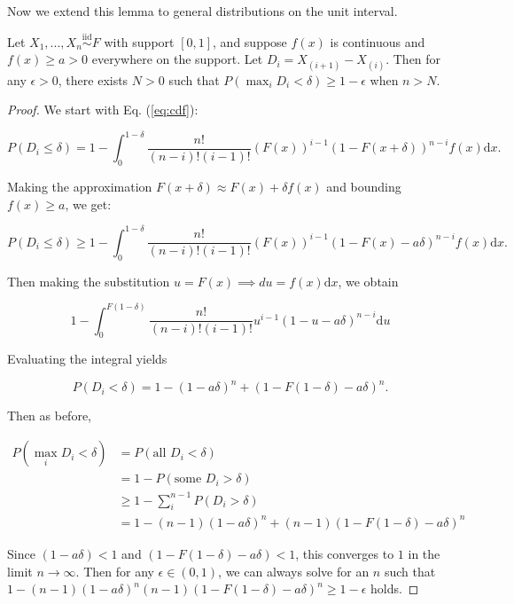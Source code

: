 \documentclass[12pt]{article}
\begin{document}
Now we extend this lemma to general distributions on the unit interval.

\begin{lemma}
\label{lem:lim-d}
Let $X_1, ..., X_n \stackrel{\mathrm{iid}}{\sim}F$ with support $[0, 1]$, and suppose $f(x)$ is continuous and $f(x) \geq a > 0$ everywhere on the support. 
Let $D_i = X_{(i+1)} - X_{(i)}$. 
Then for any $\epsilon > 0$, there exists $N > 0$ such that $P(\max_i D_i < \delta) \geq 1 - \epsilon$ when $n > N$.
\end{lemma}

\begin{proof}
We start with Eq. (\ref{eq:cdf}):

$$P(D_i \leq \delta) = 1 - \int_0^{1-\delta} \frac{n!}{(n-i)! (i-1)!} (F(x))^{i-1} (1 - F(x + \delta))^{n-i} f(x) \mathrm{d}x.$$

Making the approximation $F(x+\delta) \approx F(x) + \delta f(x)$ 
and bounding $f(x) \geq a$, we get:

$$P(D_i \leq \delta) \geq 1 - \int_0^{1-\delta} \frac{n!}{(n-i)! (i-1)!} (F(x))^{i-1} (1 - F(x) - a \delta)^{n-i} f(x) \mathrm{d}x.$$

Then making the substitution $u = F(x) \implies du = f(x) \mathrm{d}x$, we obtain 

$$1 - \int_0^{F(1-\delta)} \frac{n!}{(n-i)! (i-1)!} u^{i-1} (1 - u - a \delta)^{n-i} \mathrm{d}u$$

Evaluating the integral yields

$$P(D_i < \delta) = 1 - (1 - a \delta)^n + (1 - F(1-\delta) - a \delta)^n.$$

Then as before,

$$
\begin{aligned}
P(\max_i D_i < \delta) & = P(\text{all } D_i < \delta) \\
& = 1 - P(\text{some } D_i > \delta) \\
& \geq 1 - \sum_i^{n-1} P(D_i > \delta) \\
& = 1 - (n - 1) (1 - a \delta)^n + (n - 1) (1 - F(1 - \delta) - a \delta)^n
\end{aligned}
$$

Since $(1 - a \delta) < 1$ and $(1 - F(1-\delta) - a \delta) < 1$, this converges to $1$ in the limit $n \to \infty$. 
Then for any $\epsilon \in (0, 1)$, we can always solve for an $n$ such that $1 - (n-1) (1 - a \delta)^n (n-1) (1 - F(1 - \delta) - a \delta)^n \geq 1 - \epsilon$ holds. 
\end{proof}
\end{document}

